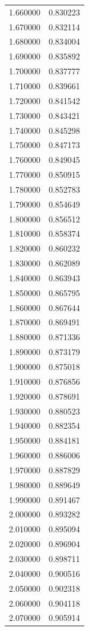 \begin{tabular}{rr}
1.660000 & 0.830223 \\
1.670000 & 0.832114 \\
1.680000 & 0.834004 \\
1.690000 & 0.835892 \\
1.700000 & 0.837777 \\
1.710000 & 0.839661 \\
1.720000 & 0.841542 \\
1.730000 & 0.843421 \\
1.740000 & 0.845298 \\
1.750000 & 0.847173 \\
1.760000 & 0.849045 \\
1.770000 & 0.850915 \\
1.780000 & 0.852783 \\
1.790000 & 0.854649 \\
1.800000 & 0.856512 \\
1.810000 & 0.858374 \\
1.820000 & 0.860232 \\
1.830000 & 0.862089 \\
1.840000 & 0.863943 \\
1.850000 & 0.865795 \\
1.860000 & 0.867644 \\
1.870000 & 0.869491 \\
1.880000 & 0.871336 \\
1.890000 & 0.873179 \\
1.900000 & 0.875018 \\
1.910000 & 0.876856 \\
1.920000 & 0.878691 \\
1.930000 & 0.880523 \\
1.940000 & 0.882354 \\
1.950000 & 0.884181 \\
1.960000 & 0.886006 \\
1.970000 & 0.887829 \\
1.980000 & 0.889649 \\
1.990000 & 0.891467 \\
2.000000 & 0.893282 \\
2.010000 & 0.895094 \\
2.020000 & 0.896904 \\
2.030000 & 0.898711 \\
2.040000 & 0.900516 \\
2.050000 & 0.902318 \\
2.060000 & 0.904118 \\
2.070000 & 0.905914 \\

\end{tabular}
